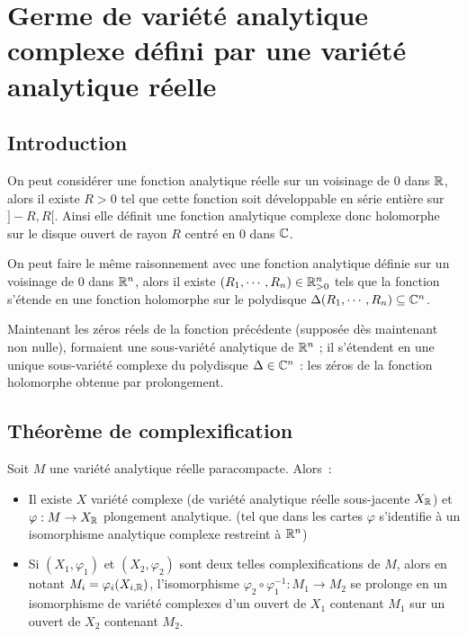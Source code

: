 \documentclass[a4paper]{article}
\begin{document}
\section{Germe de variété analytique complexe défini par une variété analytique réelle}
\subsection{Introduction}
On peut considérer une fonction analytique réelle sur un voisinage de $0$ dans $\mathbb{R}$, alors il existe $R >0$ tel que cette fonction soit développable en série entière sur $]-R,R[$. Ainsi elle définit une fonction analytique complexe donc holomorphe sur le disque ouvert de rayon $R$ centré en $0$ dans $\mathbb{C}$.

On peut faire le même raisonnement avec une fonction analytique définie sur un voisinage de $0$ dans $\mathbb{R}^n$, alors il existe $(R_1,\cdots,R_n) \in \mathbb{R}^n_{>0}$ tels que la fonction s'étende en une fonction holomorphe sur le polydisque $\Delta(R_1,\cdots,R_n) \subseteq \mathbb{C}^n$.

Maintenant les zéros réels de la fonction précédente (supposée dès maintenant non nulle), formaient une sous-variété analytique de $\mathbb{R}^n$ ; il s'étendent en une unique sous-variété complexe du polydisque $\Delta \in \mathbb{C}^n$ : les zéros de la fonction holomorphe obtenue par prolongement.

\subsection{Théorème de complexification}

\begin{thm}\label{WB1}
Soit $M$ une variété analytique réelle paracompacte. Alors~:
\begin{itemize}
\item Il existe $X$ variété complexe (de variété analytique réelle sous-jacente $X_{\mathbb{R}}$) et $\varphi : M \rightarrow X_{\mathbb{R}}$ plongement analytique. (tel que dans les cartes $\varphi$ s'identifie à un isomorphisme analytique complexe restreint à $\mathbb{R}^n$)
\item Si $(X_1, \varphi_1)$ et $(X_2,\varphi_2)$ sont deux telles complexifications de $M$, alors en notant $M_i = \varphi_i(X_{i,\mathbb{R}})$, l'isomorphisme $\varphi_2 \circ \varphi_1^{-1} : M_1 \rightarrow M_2$ se prolonge en un isomorphisme de variété complexes d'un ouvert de $X_1$ contenant $M_1$ sur un ouvert de $X_2$ contenant $M_2$.
\end{itemize}
\end{thm}
\end{document}
